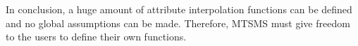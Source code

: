    
In conclusion, a huge amount of attribute interpolation functions can
be defined and no global assumptions can be made. Therefore, MTSMS
must give freedom to the users to define their own functions.








